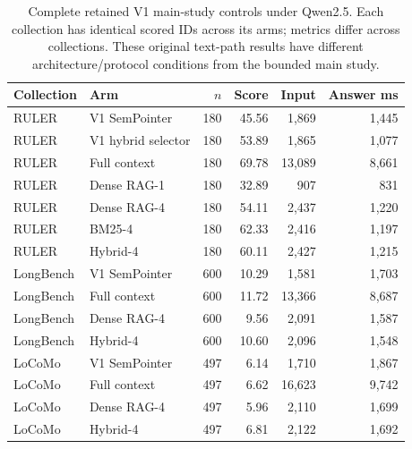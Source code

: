 \begin{table}[htbp]
\centering
\scriptsize
\setlength{\tabcolsep}{4pt}
\caption{Complete retained V1 main-study controls under Qwen2.5. Each collection has identical scored IDs across its arms; metrics differ across collections. These original text-path results have different architecture/protocol conditions from the bounded main study.}
\label{tab:v1-main}
\begin{tabular}{llrrrr}
\toprule
Collection & Arm & $n$ & Score & Input & Answer ms \\
\midrule
RULER & V1 SemPointer & 180 & 45.56 & 1,869 & 1,445 \\
RULER & V1 hybrid selector & 180 & 53.89 & 1,865 & 1,077 \\
RULER & Full context & 180 & 69.78 & 13,089 & 8,661 \\
RULER & Dense RAG-1 & 180 & 32.89 & 907 & 831 \\
RULER & Dense RAG-4 & 180 & 54.11 & 2,437 & 1,220 \\
RULER & BM25-4 & 180 & 62.33 & 2,416 & 1,197 \\
RULER & Hybrid-4 & 180 & 60.11 & 2,427 & 1,215 \\
LongBench & V1 SemPointer & 600 & 10.29 & 1,581 & 1,703 \\
LongBench & Full context & 600 & 11.72 & 13,366 & 8,687 \\
LongBench & Dense RAG-4 & 600 & 9.56 & 2,091 & 1,587 \\
LongBench & Hybrid-4 & 600 & 10.60 & 2,096 & 1,548 \\
LoCoMo & V1 SemPointer & 497 & 6.14 & 1,710 & 1,867 \\
LoCoMo & Full context & 497 & 6.62 & 16,623 & 9,742 \\
LoCoMo & Dense RAG-4 & 497 & 5.96 & 2,110 & 1,699 \\
LoCoMo & Hybrid-4 & 497 & 6.81 & 2,122 & 1,692 \\
\bottomrule
\end{tabular}
\end{table}
